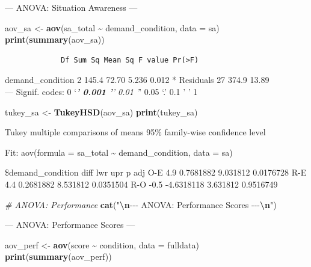 \documentclass[
]{article}
\newenvironment{Shaded}{\begin{snugshade}}{\end{snugshade}}
\newcommand{\AttributeTok}[1]{\textcolor[rgb]{0.13,0.29,0.53}{#1}}
\newcommand{\CommentTok}[1]{\textcolor[rgb]{0.56,0.35,0.01}{\textit{#1}}}
\newcommand{\FunctionTok}[1]{\textcolor[rgb]{0.13,0.29,0.53}{\textbf{#1}}}
\newcommand{\NormalTok}[1]{#1}
\newcommand{\OtherTok}[1]{\textcolor[rgb]{0.56,0.35,0.01}{#1}}
\newcommand{\SpecialCharTok}[1]{\textcolor[rgb]{0.81,0.36,0.00}{\textbf{#1}}}
\newcommand{\StringTok}[1]{\textcolor[rgb]{0.31,0.60,0.02}{#1}}
\begin{document}
--- ANOVA: Situation Awareness ---

\begin{Shaded}
\begin{Highlighting}[]
\NormalTok{aov\_sa }\OtherTok{\textless{}{-}} \FunctionTok{aov}\NormalTok{(sa\_total }\SpecialCharTok{\textasciitilde{}}\NormalTok{ demand\_condition, }\AttributeTok{data =}\NormalTok{ sa)}
\FunctionTok{print}\NormalTok{(}\FunctionTok{summary}\NormalTok{(aov\_sa))}
\end{Highlighting}
\end{Shaded}

\begin{verbatim}
             Df Sum Sq Mean Sq F value Pr(>F)  
\end{verbatim}

demand\_condition 2 145.4 72.70 5.236 0.012 * Residuals 27 374.9 13.89\\
--- Signif. codes: 0 `\emph{\textbf{' 0.001 '}' 0.01 '}' 0.05 `.' 0.1 '
' 1

\begin{Shaded}
\begin{Highlighting}[]
\NormalTok{tukey\_sa }\OtherTok{\textless{}{-}} \FunctionTok{TukeyHSD}\NormalTok{(aov\_sa)}
\FunctionTok{print}\NormalTok{(tukey\_sa)}
\end{Highlighting}
\end{Shaded}

Tukey multiple comparisons of means 95\% family-wise confidence level

Fit: aov(formula = sa\_total \textasciitilde{} demand\_condition, data =
sa)

\$demand\_condition diff lwr upr p adj O-E 4.9 0.7681882 9.031812
0.0176728 R-E 4.4 0.2681882 8.531812 0.0351504 R-O -0.5 -4.6318118
3.631812 0.9516749

\begin{Shaded}
\begin{Highlighting}[]
\CommentTok{\# ANOVA: Performance}
\FunctionTok{cat}\NormalTok{(}\StringTok{"}\SpecialCharTok{\textbackslash{}n}\StringTok{{-}{-}{-} ANOVA: Performance Scores {-}{-}{-}}\SpecialCharTok{\textbackslash{}n}\StringTok{"}\NormalTok{)}
\end{Highlighting}
\end{Shaded}

--- ANOVA: Performance Scores ---

\begin{Shaded}
\begin{Highlighting}[]
\NormalTok{aov\_perf }\OtherTok{\textless{}{-}} \FunctionTok{aov}\NormalTok{(score }\SpecialCharTok{\textasciitilde{}}\NormalTok{ condition, }\AttributeTok{data =}\NormalTok{ fulldata)}
\FunctionTok{print}\NormalTok{(}\FunctionTok{summary}\NormalTok{(aov\_perf))}
\end{Highlighting}
\end{Shaded}
\end{document}
